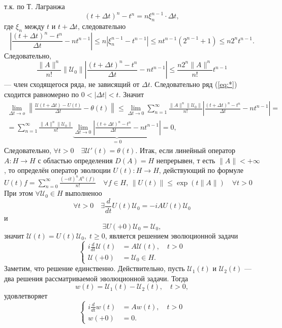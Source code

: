 \documentclass[a4paper]{article}
\begin{document}
т.\:к. по Т. Лагранжа
\[
	(t+\Delta t)^n -t^n= n \xi_n ^{n-1} \cdot \Delta t,
\]
где $\xi_n$ между $t$ и $t+\Delta t$, следовательно
\[
	\left| \frac{(t +\Delta t)^n -t^n}{\Delta t}- n t ^{n-1} \right| \le  n \left| \xi_n ^{n-1}-t ^{n-1} \right| \le 
	n t ^{n-1}(2 ^{n-1}+1)\le n 2^n t ^{n-1}
.\] 
Следовательно,
\[
	\frac{\| A\|^n}{n!}\| \mathcal{U}_0\| \left| \frac{\left( t +\Delta t \right) ^n -t^n}{\Delta t}-n t ^{n-1} \right| \le 
	\frac{n 2^n \| A\|^n}{n!}t ^{n-1}
\]
--- член сходящегося ряда, не зависящий от $\Delta t$. Следовательно
ряд (\ref{eq:*}) сходится равномерно по $0 < |\Delta t| <t$. Значит
\begin{multline*}
	\lim_{\Delta t \to o} \left\lVert \frac{\mathcal{U}(t+\Delta t)-U(t)}{\Delta t}-\theta (t)\right\rVert\le \lim_{\Delta t \to 0} 
	\sum_{n=1}^{\infty} \frac{\| A\|^n \| \mathcal{U}_0\|}{n!}
	\left| \frac{(t+\Delta t)^n -t ^n}{\Delta t}- n t ^{n-1} \right| =\\= \sum_{n=1}^{\infty} \frac{\| A\|^n \| \mathcal{U}_0\|}{n!}
	\underbrace{\lim_{\Delta t \to 0} \left| \frac{(t+\Delta t)^n-t^n}{\Delta t}- n t ^{n-1} \right| }_{=0}=0
 ,\end{multline*} 
 Следовательно, $\forall t >0 \quad \exists \mathcal{U}'(t)=\theta(t)$.
 Итак, если линейный оператор  $A: H\to H$ с областью определения
 $D(A) = H$ непрерывен, т есть $\| A\|< +\infty$, то определён
 оператор эволюции $U(t): H\to H$, действующий по формуле
 $U(t)f = \sum_{n=0}^{\infty} \frac{(-it)^n A^n(f)}{n!} \quad \forall
 f \in  H,\, \| U(t)\|\le \exp\left( t \| A\| \right) \quad \forall
 t >0$ 
 При этом $\forall \mathcal{U}_0 \in H$ выполненоо
 \[
	 \forall t>0 \quad \exists \frac{d}{dt}U(t) \mathcal{U}_0=-i A
	 U(t) \mathcal{U}_0
 \]
 и
 \[
	 \exists U(+0)\mathcal{U}_0=\mathcal{U}_0
  ,\] 
  значит $\mathcal{U}(t)=U(t)\mathcal{U}_0,\; t\ge 0$, является решением эволюционной задачи
\[
\left\{
\begin{aligned}
	i \frac{d}{dt} \mathcal{U}(t) &= A \mathcal{U}(t),\quad t>0\\
	\mathcal{U}(+0)&=\mathcal{U}_0 \in H.
\end{aligned}
\right.
\] 
Заметим, что решение единственно. Действительно, пусть $\mathcal{U}_1 (t)$ и $\mathcal{U}_2(t)$ --- два решения рассматриваемой
эволюционной задачи. Тогда
\[
	w(t) = \mathcal{U}_1(t)-\mathcal{U}_2(t), \quad t>0,
\]
удовлетворяет
\[
\left\{
\begin{aligned}
	i \frac{d}{dt} w (t) &= A w(t),\quad t>0\\
	w(+0)&=0.
\end{aligned}
\right.
\] 
\end{document}
